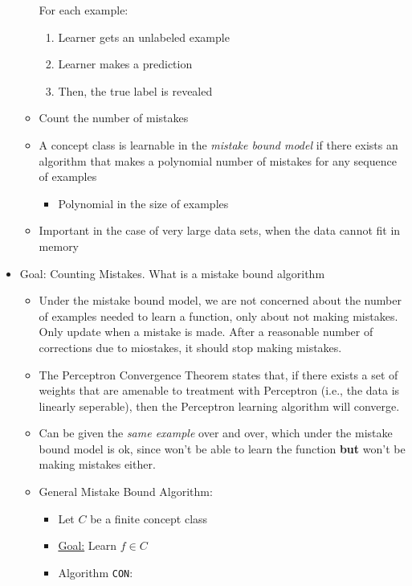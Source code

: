 \documentclass{article}
\begin{document}
\begin{itemize}
\begin{itemize}
          For each example:
          \begin{enumerate}
            \item Learner gets an unlabeled example
            \item Learner makes a prediction
            \item Then, the true label is revealed
          \end{enumerate}
        \item Count the number of mistakes
        \item A concept class is learnable in the {\em mistake bound model} if there exists an algorithm that makes a polynomial number of mistakes for any sequence of examples
          \begin{itemize}
            \item Polynomial in the size of examples
          \end{itemize}
        \item Important in the case of very large data sets, when the data cannot fit in memory
	\end{itemize}
\item Goal: Counting Mistakes. What is a mistake bound algorithm
	\begin{itemize}
	\item Under the mistake bound model, we are not concerned about the number of examples needed to learn a function, only about not making mistakes. Only update when a mistake is made. After a reasonable number of corrections due to miostakes, it should stop making mistakes.
	\item The Perceptron Convergence Theorem states that, if there exists a set of weights that are amenable to treatment with Perceptron (i.e., the data is linearly seperable), then the Perceptron learning algorithm will converge.
        \item Can be given the {\em same example} over and over, which under the mistake bound model is ok, since won't be able to learn the function {\bf but} won't be making mistakes either.
        \item General Mistake Bound Algorithm:
          \begin{itemize}
            \item Let $C$ be a finite concept class
            \item \underline{Goal:} Learn $f\in C$
            \item Algorithm \verb~CON~:
              \begin{itemize}

\end{itemize}
\end{itemize}
\end{itemize}
\end{itemize}
\end{document}
